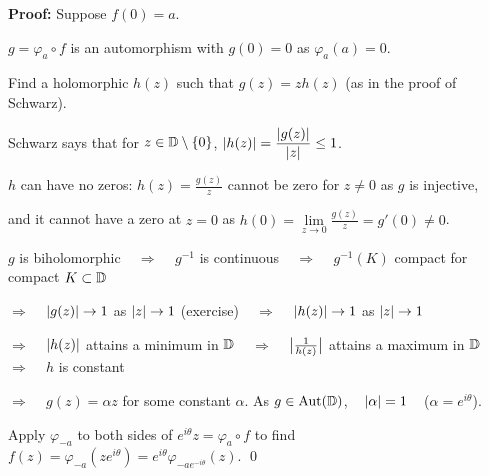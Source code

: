 \documentclass[10pt,aspectratio=169]{beamer}
\begin{document}
\begin{frame}
\textbf{Proof:}
Suppose $f(0) = a$.

\medskip
\pause

$g = \varphi_a \circ f$ is an automorphism with $g(0) = 0$ as
$\varphi_a(a) = 0$.

\medskip
\pause

Find a holomorphic $h(z)$ such that $g(z) = z h(z)$ (as in the proof of
Schwarz).

\medskip
\pause

Schwarz says that for $z \in {\mathbb{D}} \setminus \{ 0 \}$, \quad
$\lvert {h(z)} \rvert = \dfrac{\lvert {g(z)} \rvert}{\lvert {z} \rvert} \leq 1$.

\medskip
\pause

$h$ can have no zeros:
\pause
$h(z) = \frac{g(z)}{z}$ cannot be zero for $z \not= 0$ as $g$ is injective,

\pause
and it cannot have a zero at $z=0$
as $h(0) = \lim\limits_{z\to 0} \frac{g(z)}{z} = g'(0) \not= 0$.

\pause
\medskip

$g$ is biholomorphic
~ $\Rightarrow$ ~
$g^{-1}$ is continuous
\pause
~ $\Rightarrow$ ~
$g^{-1}(K)$ compact for compact $K \subset {\mathbb{D}}$

\medskip

\pause
$\Rightarrow$ ~
$\lvert {g(z)} \rvert \to 1$ as $\lvert {z} \rvert \to 1$ (exercise)
\pause
~ $\Rightarrow$ ~
$\lvert {h(z)} \rvert \to 1$ as $\lvert {z} \rvert \to 1$

\medskip
\pause

$\Rightarrow$ ~
$\lvert {h(z)} \rvert$ attains a minimum in ${\mathbb{D}}$
\pause
~ $\Rightarrow$ ~
$\bigl\lvert {\frac{1}{h(z)}} \bigr\rvert$ attains a maximum in ${\mathbb{D}}$
\pause
~ $\Rightarrow$ ~
$h$ is constant

\medskip
\pause

$\Rightarrow$ ~
$g(z) = \alpha z$ for some constant $\alpha$.
\pause
As $g \in \operatorname{Aut}({\mathbb{D}})$, ~
$\lvert {\alpha} \rvert = 1$ ~ ($\alpha = e^{i\theta}$).

\medskip
\pause

Apply $\varphi_{-a}$ to both sides of $e^{i\theta} z = \varphi_a \circ f$
to find
$f(z) = \varphi_{-a}(ze^{i\theta})
= e^{i \theta} \varphi_{-ae^{-i\theta}}(z)$.
\qed

\end{frame}
\end{document}
